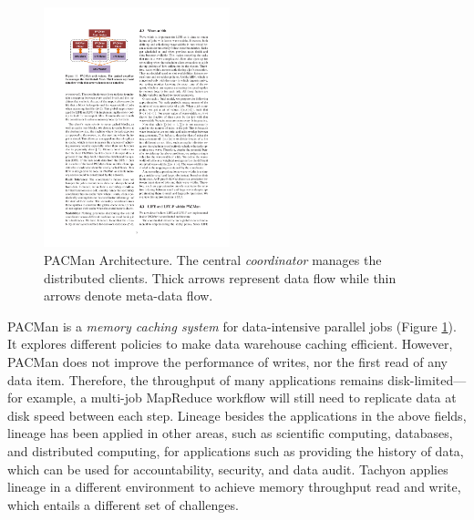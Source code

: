 \documentclass[twocolumn]{article}
\begin{document}
\begin{figure}[htb]
        \centering
        \includegraphics[width=0.48\textwidth]{pacman.pdf}
        \caption{PACMan Architecture. The central \textit{coordinator} manages the distributed clients. Thick arrows represent data flow while thin arrows denote meta-data flow.}
        \label{fig:pacman}
\end{figure} 

PACMan \cite{Anan:2012} is a \textit{memory caching system} for data-intensive parallel jobs (Figure \ref{fig:pacman}). It explores different policies to make data warehouse caching efficient. However, PACMan does not improve the performance of writes, nor the first read of any data item. Therefore, the throughput of many applications remains disk-limited—for example, a multi-job MapReduce workflow will still need to replicate data at disk speed between each step.
Lineage besides the applications in the above fields, lineage has been applied in other areas, such as scientific computing, databases, and distributed computing, for applications such as providing the history of data, which can be used for accountability, security, and data audit. Tachyon applies lineage in a different environment to achieve memory throughput read and write, which entails a different set of challenges.
\end{document}
